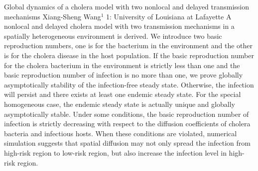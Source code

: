\begin{addmargin}[2em]{0em}
\vspace{1.5ex}
\abs
{Global dynamics of a cholera model with two nonlocal and delayed transmission mechanisms}
{Xiang-Sheng Wang$^{1}$}
{1: University of Louisiana at Lafayette}
{A nonlocal and delayed cholera model with two transmission mechanisms in a spatially heterogeneous environment is derived. We introduce two basic reproduction numbers, one is for the bacterium in the environment and the other is for the cholera disease in the host population. If the basic reproduction number for the cholera bacterium in the environment is strictly less than one and the basic reproduction number of infection is no more than one, we prove globally asymptotically stability of the infection-free steady state. Otherwise, the infection will persist and there exists at least one endemic steady state. For the special homogeneous case, the endemic steady state is actually unique and globally asymptotically stable. Under some conditions, the basic reproduction number of infection is strictly decreasing with respect to the diffusion coefficients of cholera bacteria and infectious hosts. When these conditions are violated, numerical simulation suggests that spatial diffusion may not only spread the infection from high-risk region to low-risk region, but also increase the infection level in high-risk region.}
\end{addmargin}
